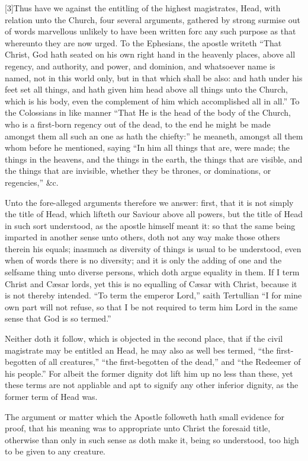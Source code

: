 [3]Thus have we against the entitling of the highest magistrates, Head, with relation unto the Church, four several arguments, gathered by strong surmise out of words marvellous unlikely to have been written forc any such purpose as that whereunto they are now urged. To the Ephesians, the apostle writeth “That Christ, God hath seated on his own right hand in the heavenly places, above all regency, and authority, and power, and dominion, and whatsoever name is named, not in this world only, but in that which shall be also: and hath under his feet set all things, and hath given him head above all things unto the Church, which is his body, even the complement of him which accomplished all in all.” To the Colossians in like manner “That He is the head of the body of the Church, who is a first-born regency out of the dead, to the end he might be made amongst them all such an one as hath the chiefty:” he meaneth, amongst all them whom before he mentioned, saying “In him all things that are, were made; the things in the heavens, and the things in the earth, the things that are visible, and the things that are invisible, whether they be thrones, or dominations, or regencies,” \&c.

Unto the fore-alleged arguments therefore we answer: first, that it is not simply the title of Head, which lifteth our Saviour above all powers, but the title of Head in such sort understood, as the apostle himself meant it: so that the same being imparted in another sense unto others, doth not any way make those others therein his equals; inasmuch as diversity of things is usual to be understood, even when of words there is no diversity; and it is only the adding of one and the selfsame thing unto diverse persons, which doth argue equality in them. If I term Christ and Cæsar lords, yet this is no equalling of Cæsar with Christ, because it is not  thereby intended. “To term the emperor Lord,” saith Tertullian “I for mine own part will not refuse, so that I be not required to term him Lord in the same sense that God is so termed.”

Neither doth it follow, which is objected in the second place, that if the civil magistrate may be entitled an Head, he may also as well bes termed, “the first-begotten of all creatures,” “the first-begotten of the dead,” and “the Redeemer of his people.” For albeit the former dignity dot lift him up no less than these, yet these terms are not appliable and apt to signify any other inferior dignity, as the former term of Head was.

The argument or matter which the Apostle followeth hath small evidence for proof, that his meaning was to appropriate unto Christ the foresaid title, otherwise than only in such sense as doth make it, being so understood, too high to be given to any creature.

